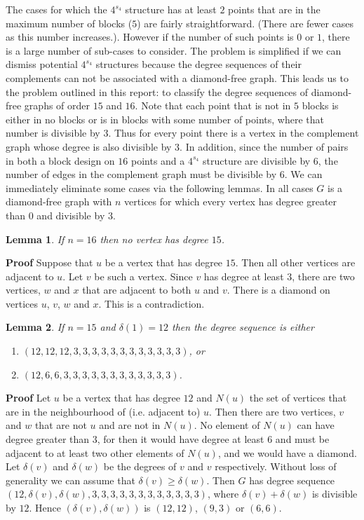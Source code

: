 \documentclass{l4proj}
\newtheorem{lemma}{Lemma}
\begin{document}
The cases for which the $4^{s_{4}}$
structure has at least $2$ points that are in the maximum number of
blocks ($5$) are fairly straightforward. (There are fewer cases as
this number increases.). However if the number of such points is $0$ or
$1$, there is a large number of sub-cases to consider. The problem is
simplified if we can dismiss potential $4^{s_{4}}$
structures because the degree sequences of their complements can not be
associated with a diamond-free graph. This leads us to the problem outlined in this report: to
classify the degree sequences of diamond-free graphs of order $15$ and
$16$.
Note that each point that is not in $5$ blocks is either in no
blocks or is in blocks with  some number of points, where that
number is divisible by $3$. Thus for every point there is a vertex 
in the complement graph whose degree is also divisible by
$3$. In addition, since the number of pairs in both a block design on
$16$ points and a 
$4^{s_{4}}$ structure are divisible by $6$, the number of edges in the
complement  graph must be divisible by $6$. We can immediately eliminate some cases via the following lemmas. In all cases $G$ is a diamond-free graph with $n$ vertices for which every vertex has degree greater than $0$ and divisible by $3$.

\begin{lemma} 
If $n=16$  then no vertex has degree $15$.
\end{lemma}

\vspace{.25cm}
{\bf Proof} Suppose that $u$ be a vertex that has degree $15$. Then all other vertices are adjacent to $u$. Let $v$ be such a vertex. 
Since $v$ has degree at least $3$, there are two vertices, $w$ and $x$ that are adjacent to both $u$ and $v$. There is a diamond on 
vertices $u$, $v$, $w$ and $x$. This is a contradiction.

\begin{lemma} If $n=15$ and $\delta(1)=12$ then the degree sequence is either 
\begin{enumerate}
\item $(12,12,12,3,3,3,3,3,3,3,3,3,3,3,3)$, or 
\vspace{-8pt}
\item $(12,6,6,3,3,3,3,3,3,3,3,3,3,3,3)$.
\end{enumerate}
\end{lemma}  

\vspace{.25cm}
{\bf Proof} Let $u$ be a vertex that has degree $12$ and $N(u)$ the set of vertices that are in the neighbourhood of (i.e. adjacent to) $u$. 
Then there are two vertices, $v$ and $w$ that are not $u$ and are not in $N(u)$. No element of $N(u)$ can have degree greater than $3$, 
for then it would have degree at least $6$ and must be adjacent to at least two other elements of $N(u)$, and we would have a diamond. 
Let $\delta(v)$ and $\delta(w)$ be the degrees of $v$ and $v$ respectively. Without loss of generality we can assume that $\delta(v) \geq \delta(w)$. 
Then $G$ has degree sequence $(12,\delta(v),\delta(w),3,3,3,3,3,3,3,3,3,3,3,3)$, where $\delta(v) + \delta(w)$ is  divisible by $12$. 
Hence $(\delta(v),\delta(w))$ is $(12,12)$, $(9,3)$ or $(6,6)$.
\end{document}
